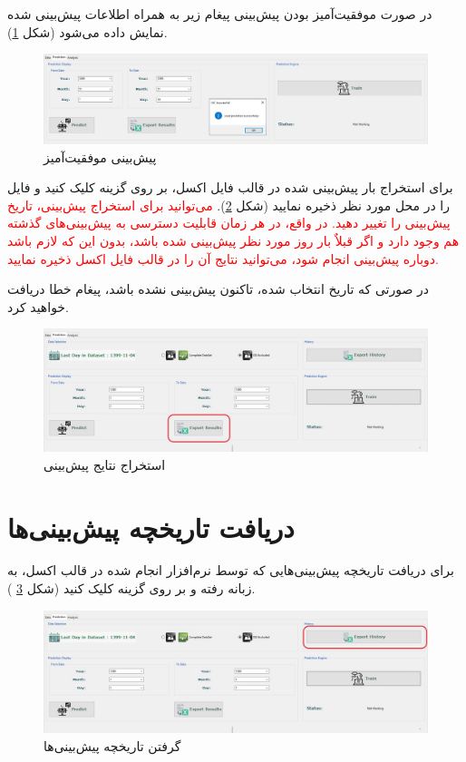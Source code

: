 \documentclass[a4paper,20pt,dvipsnames, usenames]{extbook}
\begin{document}
در صورت موفقیت‌آمیز بودن پیش‌بینی پیغام زیر به همراه اطلاعات پیش‌بینی شده نمایش داده می‌شود (شکل
\ref{fig26}).
\begin{figure}[!h]
	\centering
	\includegraphics[width = \textwidth]{fig13}
	\caption{پیش‌بینی موفقیت‌آمیز}
	\label{fig26}
\end{figure}

برای استخراج بار پیش‌بینی شده در قالب فایل اکسل، بر روی گزینه
کلیک کنید و فایل را در محل مورد نظر ذخیره نمایید (شکل
\ref{fig27}).
\textcolor{red}{می‌توانید برای استخراج پیش‌بینی، تاریخ پیش‌بینی را تغییر دهید. در واقع، در هر زمان قابلیت دسترسی به پیش‌بینی‌های گذشته هم وجود دارد و اگر قبلاٌ بار روز مورد نظر پیش‌بینی شده باشد، بدون این که لازم باشد دوباره پیش‌بینی انجام شود، می‌توانید نتایج آن را در قالب فایل اکسل ذخیره نمایید.}

در صورتی که تاریخ انتخاب شده، تاکنون پیش‌بینی نشده باشد، پیغام خطا دریافت خواهید کرد.
\begin{figure}[!h]
	\centering
	\includegraphics[width = \textwidth]{fig14}
	\caption{استخراج نتایج پیش‌بینی}
	\label{fig27}
\end{figure}
\section{دریافت تاریخچه پیش‌بینی‌ها}
برای دریافت تاریخچه پیش‌بینی‌هایی که توسط نرم‌افزار انجام شده در قالب اکسل، به زبانه
رفته و بر روی گزینه 
کلیک کنید (شکل
\ref{fig40}
).

\begin{figure}[!h]
	\centering
	\includegraphics[width = \textwidth]{fig36}
	\caption{گرفتن تاریخچه پیش‌بینی‌ها}
	\label{fig40}
\end{figure}
\end{document}
